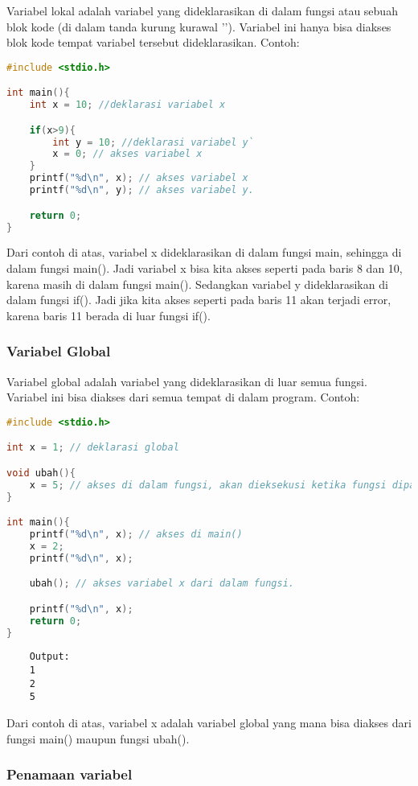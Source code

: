 Variabel lokal adalah variabel yang dideklarasikan di dalam fungsi atau sebuah blok kode (di dalam tanda kurung kurawal '{}').
Variabel ini hanya bisa diakses blok kode tempat variabel tersebut dideklarasikan.
Contoh:
\begin{lstlisting}[language=c]
#include <stdio.h>

int main(){
	int x = 10; //deklarasi variabel x

	if(x>9){
		int y = 10; //deklarasi variabel y`
		x = 0; // akses variabel x
	}
	printf("%d\n", x); // akses variabel x
	printf("%d\n", y); // akses variabel y.

	return 0;
}
\end{lstlisting}
Dari contoh di atas, variabel x dideklarasikan di dalam fungsi main, sehingga di dalam fungsi main().
Jadi variabel x bisa kita akses seperti pada baris 8 dan 10, karena masih di dalam fungsi main().
Sedangkan variabel y dideklarasikan di dalam fungsi if().
Jadi jika kita akses seperti pada baris 11 akan terjadi error, karena baris 11 berada di luar fungsi if().

\subsubsection{Variabel Global}

Variabel global adalah variabel yang dideklarasikan di luar semua fungsi.
Variabel ini bisa diakses dari semua tempat di dalam program.
Contoh:
\begin{lstlisting}[language=c]
#include <stdio.h>

int x = 1; // deklarasi global

void ubah(){
	x = 5; // akses di dalam fungsi, akan dieksekusi ketika fungsi dipanggil
}

int main(){
	printf("%d\n", x); // akses di main()
	x = 2;
	printf("%d\n", x);

	ubah(); // akses variabel x dari dalam fungsi.

	printf("%d\n", x);
	return 0;
}
\end{lstlisting}
\begin{verbatim}
	Output:
	1
	2
	5
\end{verbatim}
Dari contoh di atas, variabel x adalah variabel global yang mana bisa diakses dari fungsi main() maupun fungsi ubah().

\subsubsection{Penamaan variabel}

